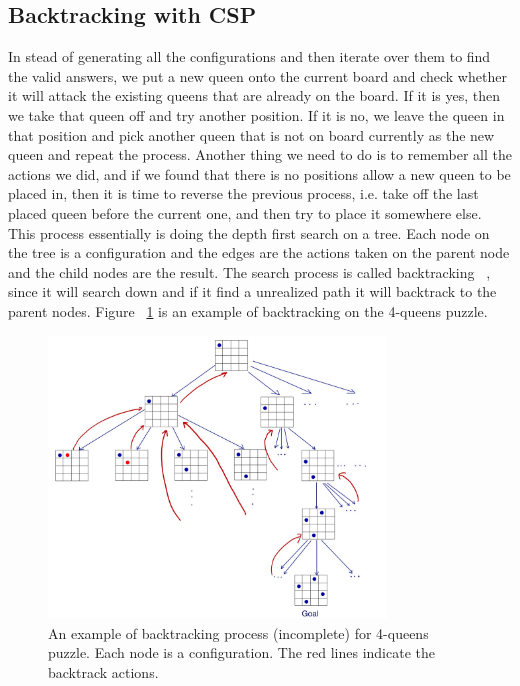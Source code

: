 \subsection{Backtracking with CSP}\label{sec:csp}
In stead of generating all the configurations and then iterate over them to find the valid answers, we put a new queen onto the current board and check whether it will attack the existing queens that are already on the board. If it is yes, then we take that queen off and try another position. If it is no, we leave the queen in that position and pick another queen that is not on board currently as the new queen and repeat the process. Another thing we need to do is to remember all the actions we did, and if we found that there is no positions allow a new queen to be placed in, then it is time to reverse the previous process, i.e. take off the last placed queen before the current one, and then try to place it somewhere else. This process essentially is doing the depth first search on a tree. Each node on the tree is a configuration and the edges are the actions taken on the parent node and the child nodes are the result. The search process is called backtracking ~\cite{russell_modern_1995}, since it will search down and if it find a unrealized path it will backtrack to the parent nodes. Figure ~\ref{fig:backtrack4Queens} is an example of backtracking on the 4-queens puzzle.
\begin{figure}[ht]
  \centering
  \includegraphics[width=0.8\textwidth]{figure/backtracking4Queens.JPG}
  \caption{An example of backtracking process (incomplete) for 4-queens puzzle. Each node is a configuration. The red lines indicate the backtrack actions.}
  \label{fig:backtrack4Queens}
\end{figure}


